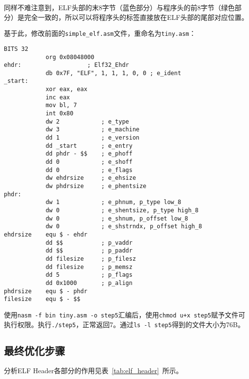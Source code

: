 \documentclass[a4paper, 11pt]{ctexart}
\begin{document}
同样不难注意到，ELF头部的末8字节（蓝色部分）与程序头的前8字节（绿色部分）是完全一致的，所以可以将程序头的标签直接放在ELF头部的尾部对应位置。

基于此，修改前面的\texttt{simple\_elf.asm}文件，重命名为\texttt{tiny.asm}：

\begin{verbatim}
BITS 32
            org 0x08048000
ehdr:                   ; Elf32_Ehdr
            db 0x7F, "ELF", 1, 1, 1, 0, 0 ; e_ident
_start:
            xor eax, eax
            inc eax
            mov bl, 7
            int 0x80
            dw 2            ; e_type
            dw 3            ; e_machine
            dd 1            ; e_version
            dd _start       ; e_entry
            dd phdr - $$    ; e_phoff
            dd 0            ; e_shoff
            dd 0            ; e_flags
            dw ehdrsize     ; e_ehsize
            dw phdrsize     ; e_phentsize
phdr:
            dw 1            ; e_phnum, p_type low_8
            dw 0            ; e_shentsize, p_type high_8
            dw 0            ; e_shnum, p_offset low_8
            dw 0            ; e_shstrndx, p_offset high_8
ehdrsize    equ $ - ehdr
            dd $$           ; p_vaddr
            dd $$           ; p_paddr
            dd filesize     ; p_filesz
            dd filesize     ; p_memsz
            dd 5            ; p_flags
            dd 0x1000       ; p_align
phdrsize    equ $ - phdr
filesize    equ $ - $$
\end{verbatim}

使用\texttt{nasm -f bin tiny.asm -o step5}汇编后，使用\texttt{chmod u+x step5}赋予文件可执行权限。执行\texttt{./step5}，正常返回7。通过\texttt{ls -l step5}得到的文件大小为76B。

\subsection{最终优化步骤}

分析ELF Header各部分的作用见表~\ref{tab:elf_header}\ 所示。
\end{document}
